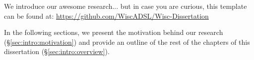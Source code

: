 We introduce our awesome research... but in case you are curious, this template can be found at: \url{https://github.com/WiscADSL/Wisc-Dissertation}

In the following sections, we present the motivation behind our research (\S\ref{sec:intro:motivation}) and provide an outline of the rest of the chapters of this dissertation (\S\ref{sec:intro:overview}).
